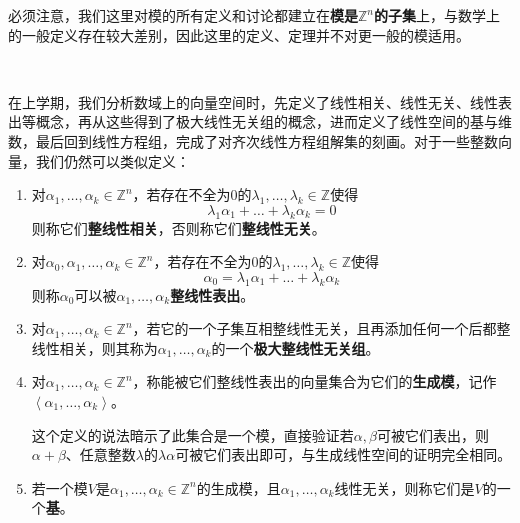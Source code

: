 \documentclass[a4paper,UTF8,fontset=windows,AutoFakeBold]{ctexart}
\newcommand*{\note}{\noindent *}
\begin{document}
\note 必须注意，我们这里对模的所有定义和讨论都建立在\textbf{模是$\mathbb{Z}^n$的子集}上，与数学上的一般定义存在较大差别，因此这里的定义、定理并不对更一般的模适用。

\

在上学期，我们分析数域上的向量空间时，先定义了线性相关、线性无关、线性表出等概念，再从这些得到了极大线性无关组的概念，进而定义了线性空间的基与维数，最后回到线性方程组，完成了对齐次线性方程组解集的刻画。对于一些整数向量，我们仍然可以类似定义：
\begin{enumerate}
    \item 对$\alpha_1,\dots,\alpha_k\in\mathbb{Z}^n$，若存在不全为0的$\lambda_1,\dots,\lambda_k\in\mathbb{Z}$使得
    $$\lambda_1\alpha_1+\dots+\lambda_k\alpha_k=0$$
    则称它们\textbf{整线性相关}，否则称它们\textbf{整线性无关}。
    \item 对$\alpha_0,\alpha_1,\dots,\alpha_k\in\mathbb{Z}^n$，若存在不全为0的$\lambda_1,\dots,\lambda_k\in\mathbb{Z}$使得
    $$\alpha_0=\lambda_1\alpha_1+\dots+\lambda_k\alpha_k$$
    则称$\alpha_0$可以被$\alpha_1,\dots,\alpha_k$\textbf{整线性表出}。
    \item 对$\alpha_1,\dots,\alpha_k\in\mathbb{Z}^n$，若它的一个子集互相整线性无关，且再添加任何一个后都整线性相关，则其称为$\alpha_1,\dots,\alpha_k$的一个\textbf{极大整线性无关组}。
    \item 对$\alpha_1,\dots,\alpha_k\in\mathbb{Z}^n$，称能被它们整线性表出的向量集合为它们的\textbf{生成模}，记作$\left<\alpha_1,\dots,\alpha_k\right>$。
    
    \note 这个定义的说法暗示了此集合是一个模，直接验证若$\alpha,\beta$可被它们表出，则$\alpha+\beta$、任意整数$\lambda$的$\lambda\alpha$可被它们表出即可，与生成线性空间的证明完全相同。
    \item 若一个模$V$是$\alpha_1,\dots,\alpha_k\in\mathbb{Z}^n$的生成模，且$\alpha_1,\dots,\alpha_k$线性无关，则称它们是$V$的一个\textbf{基}。
\end{enumerate}
\end{document}
